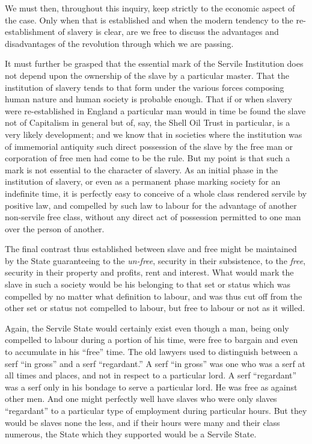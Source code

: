 \documentclass{book}
\begin{document}
We must then, throughout this inquiry, keep strictly to the economic aspect of the case. Only when that is established and when the modern tendency to the re-establishment of slavery is clear, are we free to discuss the advantages and disadvantages of the revolution through which we are passing.

It must further be grasped that the essential mark of the Servile Institution does not depend upon the ownership of the slave by a particular master. That the institution of slavery tends to that form under the various forces composing human nature and human society is probable enough. That if or when slavery were re-established in England a particular man would in time be found the slave not of Capitalism in general but of, say, the Shell Oil Trust in particular, is a very likely development; and we know that in societies where the institution was of immemorial antiquity such direct possession of the slave by the free man or corporation of free men had come to be the rule. But my point is that such a mark is not essential to the character of slavery. As an initial phase in the institution of slavery, or even as a permanent phase marking society for an indefinite time, it is perfectly easy to conceive of a whole class rendered servile by positive law, and compelled by such law to labour for the advantage of another non-servile free class, without any direct act of possession permitted to one man over the person of another.

The final contrast thus established between slave and free might be maintained by the State guaranteeing to the \emph{un-free}, security in their subsistence, to the \emph{free}, security in their property and profits, rent and interest. What would mark the slave in such a society would be his belonging to that set or status which was compelled by no matter what definition to labour, and was thus cut off from the other set or status not compelled to labour, but free to labour or not as it willed.

Again, the Servile State would certainly exist even though a man, being only compelled to labour during a portion of his time, were free to bargain and even to accumulate in his “free” time. The old lawyers used to distinguish between a serf “in gross” and a serf “regardant.” A serf “in gross” was one who was a serf at all times and places, and not in respect to a particular lord. A serf “regardant” was a serf only in his bondage to serve a particular lord. He was free as against other men. And one might perfectly well have slaves who were only slaves “regardant” to a particular type of employment during particular hours. But they would be slaves none the less, and if their hours were many and their class numerous, the State which they supported would be a Servile State.
\end{document}
